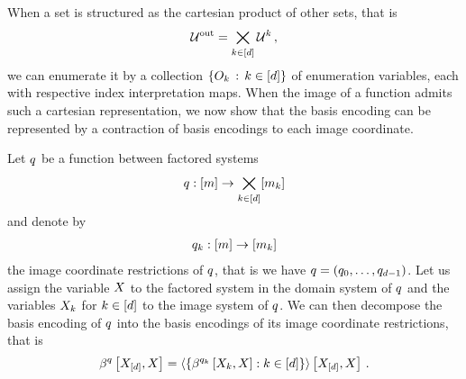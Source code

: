 
When a set is structured as the cartesian product of other sets, that is
\begin{align*}
    \mathcal{U}^{\mathrm{out}} = \bigtimes_{k\in[d]} \mathcal{U}^{k} \, ,
\end{align*}
we can enumerate it by a collection $\{O_{k} \, : \, k\in[d]\}$ of enumeration variables, each with respective index interpretation maps.
When the image of a function admits such a cartesian representation, we now show that the basis encoding can be represented by a contraction of basis encodings to each image coordinate.

\begin{theorem}
    \label{the:functionImageDecompositionContraction}
    Let $q$ be a function between factored systems
    \begin{align*}
        q : [m] \rightarrow  \bigtimes_{k\in[d]}[m_{k}]
    \end{align*}
    and denote by
    \begin{align*}
        q_{k} : [m] \rightarrow [m_{k}]
    \end{align*}
    the image coordinate restrictions of $q$, that is we have $q=(q_{0},\ldots,q_{d-1})$.
    Let us assign the variable $X$ to the factored system in the domain system of $q$ and the variables $X_{k}$ for $k\in[d]$ to the image system of $q$.
    We can then decompose the basis encoding of $q$ into the basis encodings of its image coordinate restrictions, that is
    \begin{align*}
        \beta^{q}\left[X_{[d]},X\right]
        = \left\langle 
            \{\beta^{q_{k}}\left[X_{k},X\right] : k\in[d] \}
        \right\rangle \left[ X_{[d]},X \right] \, .
    \end{align*}
\end{theorem}
